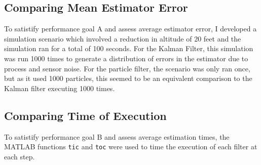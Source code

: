 \subsection{Comparing Mean Estimator Error}

To satistify performance goal A and assess average estimator error, I
developed a simulation scenario which involved a reduction in altitude of 20
feet and the simulation ran for a total of 100 seconds. For the Kalman
Filter, this simulation was run 1000 times to generate a
distribution of errors in the estimator due to process and sensor
noise. For the particle filter, the scenario was only ran once, but as
it used 1000 particles, this seemed to be an equivalent comparison to
the Kalman filter executing 1000 times.

\subsection{Comparing Time of Execution}

To satistify performance goal B and assess average estimation times,
the MATLAB functions \texttt{tic} and \texttt{toc} were used to time the
execution of each filter at each step.
